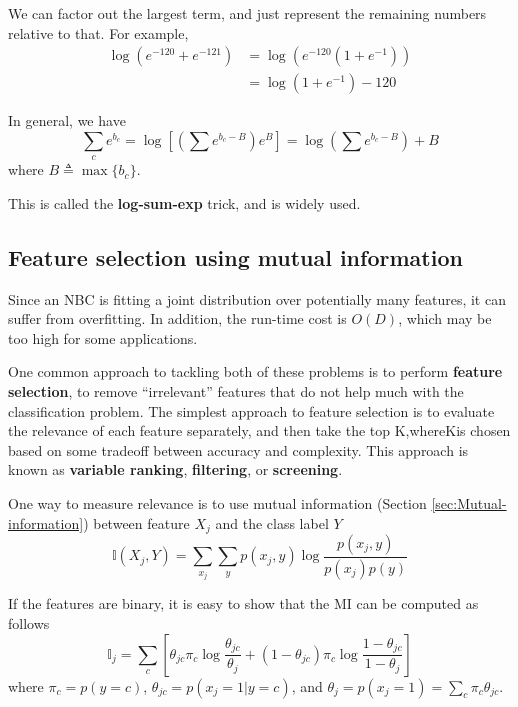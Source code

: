 We can factor out the largest term, and just represent the remaining numbers relative to that. For example,
\begin{equation}\begin{split}
\log(e^{-120}+e^{-121}) & =\log(e^{-120}(1+e^{-1})) \\
   & =\log(1+e^{-1})-120
\end{split}\end{equation}

In general, we have
\begin{equation}
\sum\limits_{c}e^{b_{c}}=\log\left[(\sum e^{b_c-B})e^B\right]=\log\left(\sum e^{b_c-B}\right)+B
\end{equation}
where $B \triangleq \max\{b_c\}$.

This is called the \textbf{log-sum-exp} trick, and is widely used. 


\subsection{Feature selection using mutual information}
Since an NBC is fitting a joint distribution over potentially many features, it can suffer from overfitting. In addition, the run-time cost is $O(D)$, which may be too high for some applications. 

One common approach to tackling both of these problems is to perform \textbf{feature selection}, to remove “irrelevant” features that do not help much with the classification problem. The simplest approach to feature selection is to evaluate the relevance of each feature separately, and then take the top K,whereKis chosen based on some tradeoff between accuracy and complexity. This approach is known as \textbf{variable ranking}, \textbf{filtering}, or \textbf{screening}.

One way to measure relevance is to use mutual information (Section \ref{sec:Mutual-information}) between feature $X_j$ and the class label $Y$
\begin{equation}
\mathbb{I}(X_j,Y)=\sum\limits_{x_j}{\sum\limits_{y}{p(x_j,y)\log \dfrac{p(x_j,y)}{p(x_j)p(y)}}}
\end{equation}

If the features are binary, it is easy to show that the MI can be computed as follows
\begin{equation}
\mathbb{I}_j = \sum\limits_c \left[\theta_{jc}\pi_c\log{\dfrac{\theta_{jc}}{\theta_j}}+(1-\theta_{jc})\pi_c\log{\dfrac{1-\theta_{jc}}{1-\theta_j}}\right]
\end{equation}
where $\pi_c=p(y=c)$, $\theta_{jc}=p(x_j=1|y=c)$, and $\theta_j=p(x_j=1)=\sum_{c} \pi_c\theta_{jc}$.


